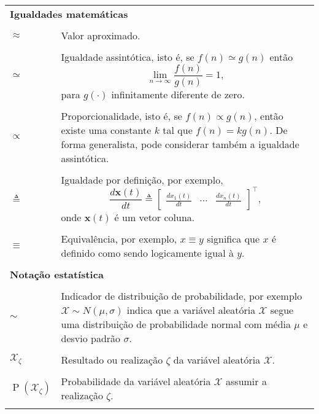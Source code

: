 \begin{longtable}{p{1in}p{4.5in}}
\multicolumn{2}{l}{\bf Igualdades matemáticas}
\index{igualdades}
\tabularnewline
\tabularnewline

$\approx$ \dotfill &
\index{$\approx$}%
Valor aproximado.
\tabularnewline
\tabularnewline

$\simeq$ \dotfill &
\index{$\simeq$}%
Igualdade assintótica, isto é, se $f(n) \simeq g(n)$ então
\begin{equation*}
\lim_{n\rightarrow\infty}\frac{f(n)}{g(n)}=1\text{,}
\end{equation*}
para $g(\cdot)$ infinitamente diferente de zero.
\tabularnewline
\tabularnewline

$\propto$ \dotfill &
\index{$\propto$}%
Proporcionalidade, isto é, se $f(n) \propto g(n)$, então existe uma constante
$k$ tal que $f(n)=kg(n)$.
De forma generalista, pode considerar também a igualdade assintótica.
\tabularnewline
\tabularnewline

$\triangleq$ \dotfill &
\index{$\triangleq$}%
Igualdade por definição, por exemplo,
\begin{equation*}
\frac{d\mathbf{x}(t)}{dt}
\triangleq
\begin{bmatrix}
\frac{dx_1(t)}{dt} & \dotsb & \frac{dx_n(t)}{dt}
\end{bmatrix}^\intercal\text{,}
\end{equation*}
onde $\mathbf{x}(t)$ é um vetor coluna.
\tabularnewline
\tabularnewline

$\equiv$ \dotfill &
\index{$\equiv$}%
Equivalência, por exemplo, $x \equiv y$ significa que $x$ é definido como sendo
logicamente igual à $y$.
\tabularnewline
\tabularnewline

\multicolumn{2}{l}{\bf Notação estatística}
\tabularnewline
\tabularnewline

$\sim$ \dotfill &
Indicador de distribuição de probabilidade, por exemplo $\mathcal{X} \sim
N(\mu,\sigma)$ indica que a variável aleatória $\mathcal{X}$ segue uma
distribuição de probabilidade normal com média $\mu$ e desvio padrão $\sigma$.
\index{media@média}%
\index{desvio padrao@desvio padrão}%
\tabularnewline
\tabularnewline

$\mathcal{X}_\zeta$ \dotfill &
\index{variavel aleatoria@variável aleatória!realizacao@realização}%
Resultado ou realização $\zeta$ da variável aleatória $\mathcal{X}$.
\tabularnewline
\tabularnewline

$\operatorname{P}(\mathcal{X}_\zeta)$ \dotfill &
\index{probabilidade}%
\index{$\operatorname{P}(\mathcal{X}_\zeta)$}%
Probabilidade da variável aleatória $\mathcal{X}$ assumir a realização $\zeta$.
\tabularnewline
\tabularnewline


\end{longtable}
